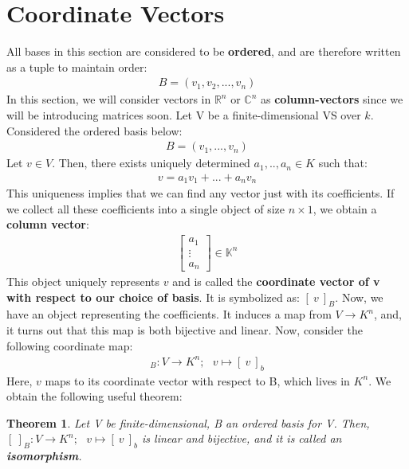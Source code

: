 \documentclass[a4paper, 12pt]{article}
\newtheorem{theorem}{Theorem}
\theoremstyle{definition}
\theoremstyle{definition}
\theoremstyle{definition}
\theoremstyle{definition}
\begin{document}
{\section{Coordinate Vectors}
All bases in this section are considered to be \textbf{ordered}, and are therefore written as a tuple to maintain order: 
\begin{align*}
	B = (v_1, v_2, ..., v_n) 
\end{align*}
In this section, we will consider vectors in $\mathbb{R}^n$ or $\mathbb{C}^n$ as \textbf{column-vectors} since we will be introducing matrices soon. 
\newline
\newline
Let V be a finite-dimensional VS over $k$. Considered the ordered basis below: 
\begin{align*}
	B = (v_1, ..., v_n)
\end{align*}
Let $v \in V$. Then, there exists uniquely determined $a_1,..,a_n \in K$ such that: 
\begin{align*}
	v = a_1v_1 + ... + a_n v_n 
\end{align*}
This uniqueness implies that we can find any vector just with its coefficients. If we collect all these coefficients into a single object of size $n \times 1$, we obtain a \textbf{column vector}: 
\begin{align*}
	\begin{bmatrix}
		a_1 \\
		\vdots \\
		a_n
	\end{bmatrix} \in \mathbb{K}^n
\end{align*}
This object uniquely represents $v$ and is called the \textbf{coordinate vector of v with respect to our choice of basis}. It is symbolized as: $[\ v\ ]_B$. Now, we have an object representing the coefficients. It induces a map from $V \rightarrow K^n$, and, it turns out that this map is both bijective and linear. 
\newline
\newline
Now, consider the following coordinate map: 
\begin{align*}
	[\ ]_B: V \rightarrow K^n; \mbox{   } v \mapsto [\ v\ ]_b 
\end{align*}
Here, $v$ maps to its coordinate vector with respect to B, which lives in $K^n$. We obtain the following useful theorem:
\begin{theorem}\label{coordinate_bij}
	Let V be finite-dimensional, B an ordered basis for V. Then, $	[\ ]_B: V \rightarrow K^n; \mbox{   } v \mapsto [\ v\ ]_b $ is linear and bijective, and it is called an \textbf{isomorphism}.  

\end{theorem}}
\end{document}
